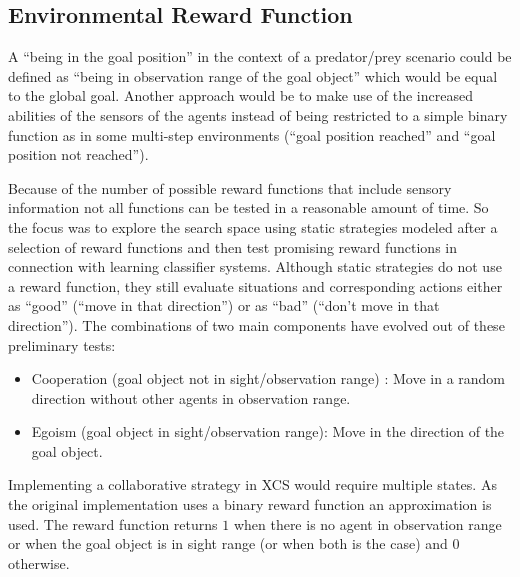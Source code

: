\subsection{Environmental Reward Function}
\label{subsection:environment-reward-function}

A ``being in the goal position'' in the context of a predator/prey scenario could be defined as ``being in observation range of the goal object'' which would be equal to the global goal. Another approach would be to make use of the increased abilities of the sensors of the agents instead of being restricted to a simple binary function as in some multi-step environments (``goal position reached'' and ``goal position not reached''). 

Because of the number of possible reward functions that include sensory information not all functions can be tested in a reasonable amount of time. So the focus was to explore the search space using static strategies modeled after a selection of reward functions and then test promising reward functions in connection with learning classifier systems. Although static strategies do not use a reward function, they still evaluate situations and corresponding actions either as ``good'' (``move in that direction'') or as ``bad'' (``don't move in that direction''). The combinations of two main components have evolved out of these preliminary tests: 
\begin{itemize}
	\item Cooperation (goal object not in sight/observation range) : Move in a random direction without other agents in observation range.
	\item Egoism (goal object in sight/observation range): Move in the direction of the goal object.
\end{itemize}




Implementing a collaborative strategy in XCS would require multiple states. As the original implementation uses a binary reward function an approximation is used. The reward function returns $1$ when there is no agent in observation range or when the goal object is in sight range (or when both is the case) and $0$ otherwise.


